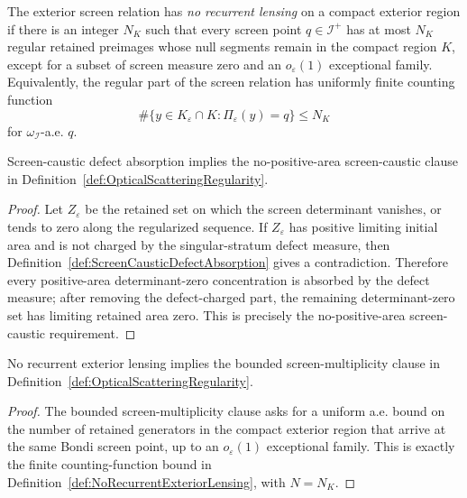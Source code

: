 \begin{definition}\label{def:NoRecurrentExteriorLensing}
The exterior screen relation has \emph{no recurrent lensing} on a compact exterior region if there is an integer $N_K$ such that every screen point $q\in\mathscr I^+$ has at most $N_K$ regular retained preimages whose null segments remain in the compact region $K$, except for a subset of screen measure zero and an $o_\varepsilon(1)$ exceptional family. Equivalently, the regular part of the screen relation has uniformly finite counting function
\[
    \#\{y\in K_\varepsilon\cap K:\Pi_\varepsilon(y)=q\}\le N_K
\]
for $\omega_{\mathscr I}$-a.e. $q$.
\end{definition}

\begin{lemma}\label{lem:DefectAbsorptionNoCaustic}
Screen-caustic defect absorption implies the no-positive-area screen-caustic clause in Definition~\ref{def:OpticalScatteringRegularity}.
\end{lemma}

\begin{proof}
Let $Z_\varepsilon$ be the retained set on which the screen determinant vanishes, or tends to zero along the regularized sequence. If $Z_\varepsilon$ has positive limiting initial area and is not charged by the singular-stratum defect measure, then Definition~\ref{def:ScreenCausticDefectAbsorption} gives a contradiction. Therefore every positive-area determinant-zero concentration is absorbed by the defect measure; after removing the defect-charged part, the remaining determinant-zero set has limiting retained area zero. This is precisely the no-positive-area screen-caustic requirement.
\end{proof}

\begin{lemma}\label{lem:NoRecurrentLensingMultiplicity}
No recurrent exterior lensing implies the bounded screen-multiplicity clause in Definition~\ref{def:OpticalScatteringRegularity}.
\end{lemma}

\begin{proof}
The bounded screen-multiplicity clause asks for a uniform a.e. bound on the number of retained generators in the compact exterior region that arrive at the same Bondi screen point, up to an $o_\varepsilon(1)$ exceptional family. This is exactly the finite counting-function bound in Definition~\ref{def:NoRecurrentExteriorLensing}, with $N=N_K$.
\end{proof}

